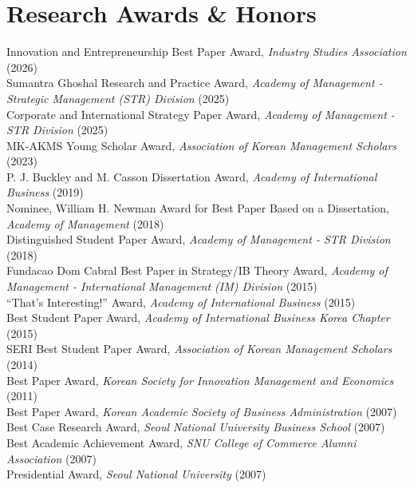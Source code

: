 \documentclass[11pt]{article}
\begin{document}
\section{Research Awards \& Honors}
\vspace{3pt}
Innovation and Entrepreneurship Best Paper Award, \textit{Industry Studies Association} (2026)\\
Sumantra Ghoshal Research and Practice Award, \emph{Academy of Management - Strategic Management (STR) Division} (2025)\\
Corporate and International Strategy Paper Award, \emph{Academy of Management - STR Division} (2025)\\
MK-AKMS Young Scholar Award, \emph{Association of Korean Management Scholars} (2023)\\
P. J. Buckley and M. Casson Dissertation Award, \emph{Academy of International Business} (2019)\\
Nominee, William H. Newman Award for Best Paper Based on a Dissertation, \emph{Academy of Management} (2018)\\
Distinguished Student Paper Award, \emph{Academy of Management - STR Division} (2018)\\
Fundacao Dom Cabral Best Paper in Strategy/IB Theory Award, \emph{Academy of Management - International Management (IM) Division} (2015)\\
``That's Interesting!'' Award, \emph{Academy of International Business} (2015)\\
Best Student Paper Award, \emph{Academy of International Business Korea Chapter} (2015)\\
SERI Best Student Paper Award, \emph{Association of Korean Management Scholars} (2014)\\
Best Paper Award, \emph{Korean Society for Innovation Management and Economics} (2011)\\
Best Paper Award, \emph{Korean Academic Society of Business Administration} (2007)\\
Best Case Research Award, \emph{Seoul National University Business School} (2007)\\
Best Academic Achievement Award, \emph{SNU College of Commerce Alumni Association} (2007)\\
Presidential Award, \emph{Seoul National University} (2007)
\end{document}
